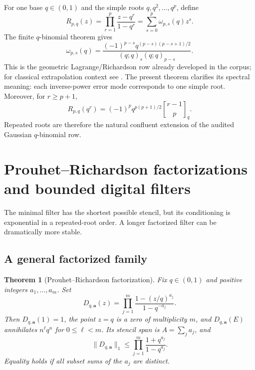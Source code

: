 \documentclass[11pt]{article}
\numberwithin{equation}{section}
\newtheorem{theorem}{Theorem}[section]
\theoremstyle{definition}
\theoremstyle{remark}
\newcommand{\qbinom}[3]{\genfrac{[}{]}{0pt}{}{#1}{#2}_{#3}}
\begin{document}
For one base $q\in(0,1)$ and the simple roots $q,q^2,\ldots,q^p$, define
\begin{equation}
 R_{p,q}(z)=\prod_{r=1}^{p}\frac{z-q^r}{1-q^r}
 =\sum_{s=0}^{p}\omega_{p,s}(q)z^s.
 \label{p6:eq:q-richardson-poly}
\end{equation}
The finite $q$-binomial theorem gives
\begin{equation}
 \boxed{
 \omega_{p,s}(q)
 =\frac{(-1)^{p-s}q^{(p-s)(p-s+1)/2}}
 {(q;q)_s(q;q)_{p-s}}.}
 \label{p6:eq:q-richardson-weights}
\end{equation}
This is the geometric Lagrange/Richardson row already developed in the corpus; for
classical extrapolation context see \cite{p6:sidi2006}.  The
present theorem clarifies its spectral meaning: each inverse-power error mode corresponds
to one simple root.  Moreover, for $r\ge p+1$,
\begin{equation}
 R_{p,q}(q^r)
 =(-1)^pq^{p(p+1)/2}\qbinom{r-1}{p}{q}.
 \label{p6:eq:q-moment-transform}
\end{equation}
Repeated roots are therefore the natural confluent extension of the audited Gaussian
$q$-binomial row.

\section{Prouhet--Richardson factorizations and bounded digital filters}
\label{p6:sec:digital}

The minimal filter has the shortest possible stencil, but its conditioning is exponential
in a repeated-root order.  A longer factorized filter can be dramatically more stable.

\subsection{A general factorized family}

\begin{theorem}[Prouhet--Richardson factorization]
\label{p6:thm:general-digital}
Fix $q\in(0,1)$ and positive integers $a_1,\ldots,a_m$.  Set
\begin{equation}
 D_{q,\bm a}(z)
 =\prod_{j=1}^{m}
 \frac{1-(z/q)^{a_j}}{1-q^{-a_j}}.
 \label{p6:eq:general-digital-filter}
\end{equation}
Then $D_{q,\bm a}(1)=1$, the point $z=q$ is a zero of multiplicity $m$, and
$D_{q,\bm a}(E)$ annihilates $n^\ell q^n$ for $0\le\ell<m$.  Its stencil span is
$A=\sum_ja_j$, and
\begin{equation}
 \|D_{q,\bm a}\|_1
 \le\prod_{j=1}^{m}\frac{1+q^{a_j}}{1-q^{a_j}}.
 \label{p6:eq:general-digital-condition}
\end{equation}
Equality holds if all subset sums of the $a_j$ are distinct.
\end{theorem}
\end{document}
